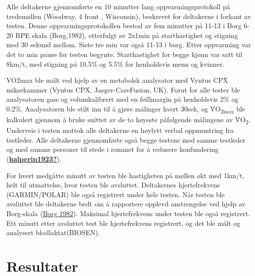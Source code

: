 \documentclass[
]{book}
\begin{document}
Alle deltakerne gjennomførte en 10 minutter lang oppvarmingsprotokoll på
tredemøllen (Woodway, 4 front , Wisconsin), beskrevet for deltakerne i
forkant av testen. Denne oppvarmingsprotokollen bestod av fem minutter
på 11-13 i Borg 6-20 RPE skala (Borg,1982), etterfulgt av 2x1min på
starthastighet og stigning med 30 sekund mellom. Siste tre min var også
11-13 i borg. Etter oppvarming var det to min pause før testen begynte.
Starthastighet for begge kjønn var satt til 8km/t, med stigning på
10.5\% og 5.5\% for henholdsvis menn og kvinner.

̇VO2max ble målt ved hjelp av en metabolsk analysator med Vyntus CPX
miksekammer (Vyntus CPX, Jaeger-CareFusion, UK). Forut for alle tester
ble analysatoren gass og volumkalibrert med en feillmargin på
henholdsvis 2\% og 0.2\%. Analysatoren ble stilt inn til å gjøre
målinger hvert 30sek, og V̇O\textsubscript{2max} ble kalkulert gjennom å
bruke snittet av de to høyeste påfølgende målingene av
V̇O\textsubscript{2}. Underveis i testen mottok alle deltakerne en
høylytt verbal oppmuntring fra testleder. Alle deltakerne gjennomførte
også begge testene med samme testleder og med samme personer til stede i
rommet for å redusere konfundering
(\protect\hyperlink{ref-halperin1923}{\textbf{halperin1923?}}).

For hvert medgåtte minutt av testen ble hastigheten på møllen økt med
1km/t, helt til utmattelse, hvor testen ble avsluttet. Deltakernes
hjertefrekvens (GARMIN/POLAR) ble også registrert under hele testen. Når
testen ble avsluttet ble deltakerne bedt om å rapportere opplevd
anstrengelse ved hjelp av Borg-skala
(\protect\hyperlink{ref-borg1982}{Borg 1982}). Maksimal hjertefrekvens
under testen ble også registrert. Ett minutt etter avsluttet test ble
hjertefrekvens registrert, og det ble målt og analysert
blodlaktat(BIOSEN).

\hypertarget{resultater}{%
\section{Resultater}\label{resultater}}

\providecommand{\docline}[3]{\noalign{\global\setlength{\arrayrulewidth}{#1}}\arrayrulecolor[HTML]{#2}\cline{#3}}

\setlength{\tabcolsep}{2pt}

\renewcommand*{\arraystretch}{1.5}
\end{document}
